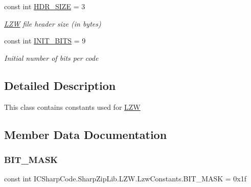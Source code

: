 \begin{DoxyCompactItemize}
const int \hyperlink{class_i_c_sharp_code_1_1_sharp_zip_lib_1_1_l_z_w_1_1_lzw_constants_a835c9af92adae329fbe895a96c2e5e53}{H\+D\+R\+\_\+\+S\+I\+ZE} = 3
\begin{DoxyCompactList}\small\item\em \hyperlink{namespace_i_c_sharp_code_1_1_sharp_zip_lib_1_1_l_z_w}{L\+ZW} file header size (in bytes) \end{DoxyCompactList}\item 
const int \hyperlink{class_i_c_sharp_code_1_1_sharp_zip_lib_1_1_l_z_w_1_1_lzw_constants_a1fc355106407d28a9df8d709f8c43baf}{I\+N\+I\+T\+\_\+\+B\+I\+TS} = 9
\begin{DoxyCompactList}\small\item\em Initial number of bits per code \end{DoxyCompactList}\end{DoxyCompactItemize}


\subsection{Detailed Description}
This class contains constants used for \hyperlink{namespace_i_c_sharp_code_1_1_sharp_zip_lib_1_1_l_z_w}{L\+ZW} 



\subsection{Member Data Documentation}
\mbox{\label{class_i_c_sharp_code_1_1_sharp_zip_lib_1_1_l_z_w_1_1_lzw_constants_ad8be2c1fdee4bc91de1dcee3d014488e}} 
\subsubsection{\texorpdfstring{B\+I\+T\+\_\+\+M\+A\+SK}{BIT\_MASK}}
{\footnotesize\ttfamily const int I\+C\+Sharp\+Code.\+Sharp\+Zip\+Lib.\+L\+Z\+W.\+Lzw\+Constants.\+B\+I\+T\+\_\+\+M\+A\+SK = 0x1f}



